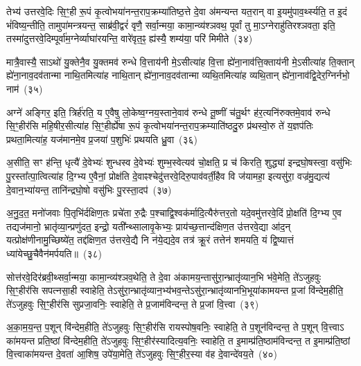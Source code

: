 {\anuvakamend[{यात॒वै ह॑वि॒र्धान॑ञ्च प॒शून्पा॒प्मना॒\-ऽष्टाद॑श च}]}%

तेभ्य॑ उत्तरवे॒दिः सि॒ꣳ॒ही रू॒पं कृ॒त्वोभया॑नन्त॒राप॒क्रम्या॑तिष्ठ॒त्ते दे॒वा अ॑मन्यन्त यत॒रान् वा इ॒यमु॑पाव॒र्थ्स्यति॒ त इ॒दं भं॑विष्य॒न्तीति॒ तामुपा॑मन्त्रयन्त॒ साब्र॑वी॒द्वरं॑ वृणै॒ सर्वा॒न्मया॒ कामा॒न्व्य॑श्ञवथ॒ पूर्वां तु मा॒\-ऽग्नेराहु॑तिरश्ञवता॒ इति॒ तस्मा॑दुत्तरवे॒दिम्पूर्वा॑म॒ग्नेर्व्याघा॑रयन्ति॒ वारे॑वृत॒ꣴ॒ ह्य॑स्यै॒ शम्य॑या॒ परि॑ मिमीते~(३४)

मात्रै॒वास्यै॒ सा\-ऽथो॑ यु॒क्तेनै॒व यु॒क्तमव॑ रुन्धे वि॒त्ताय॑नी मे॒\-ऽसीत्या॑ह वि॒त्ता ह्ये॑ना॒नाव॑त्ति॒क्ताय॑नी मे॒\-ऽसीत्या॑ह ति॒क्तान् ह्ये॑ना॒नाव॒दव॑तान्मा नाथि॒तमित्या॑ह नाथि॒तान् ह्ये॑ना॒नाव॒दव॑तान्मा व्यथि॒तमित्या॑ह व्यथि॒तान् ह्ये॑ना॒नाव॑द्वि॒देर॒ग्निर्नभो॒ नाम॑~(३५)

अग्ने॑ अङ्गिर॒ इति॒ त्रिर्\mbox{}ह॑रति॒ य ए॒वैषु लो॒केष्व॒ग्नय॒स्ताने॒वाव॑ रुन्धे तू॒ष्णीं च॑तु॒र्थꣳ ह॑र॒त्यनि॑रुक्तमे॒वाव॑ रुन्धे सि॒ꣳ॒हीर॑सि महि॒षीर॒सीत्या॑ह सि॒ꣳ॒हीर्\mbox{}ह्ये॑षा रू॒पं कृ॒त्वोभया॑नन्त॒राप॒क्रम्याति॑ष्ठदु॒रु प्र॑थस्वो॒रु ते॑ य॒ज्ञप॑तिः प्रथता॒मित्या॑ह॒ यज॑मानमे॒व प्र॒जया॑ प॒शुभिः॑ प्रथयति ध्रु॒वा~(३६)

अ॒सीति॒ सꣳ ह॑न्ति॒ धृत्यै॑ दे॒वेभ्यः॑ शुन्धस्व दे॒वेभ्यः॑ शुम्भ॒स्वेत्यव॑ चो॒क्षति॒ प्र च॑ किरति॒ शुद्ध्या॑ इन्द्रघो॒षस्त्वा॒ वसु॑भिः पु॒रस्ता᳚त्पा॒त्वित्या॑ह दि॒ग्भ्य ए॒वैनां॒ प्रोक्ष॑ति दे॒वाꣴश्चेदु॑त्तरवे॒दिरु॒पाव॑वर्ती॒हैव वि ज॑यामहा॒ इत्यसु॑रा॒ वज्र॑मु॒द्यत्य॑ दे॒वान॒भ्या॑यन्त॒ तानि॑न्द्रघो॒षो वसु॑भिः पु॒रस्ता॒दप॑~(३७)

अ॒नु॒द॒त॒ मनो॑जवाः पि॒तृभि॑र्दक्षिण॒तः प्रचे॑ता रु॒द्रैः प॒श्चाद्वि॒श्वक॑र्मादि॒त्यैरु॑त्तर॒तो यदे॒वमु॑त्तरवे॒दिं प्रो॒क्षति॑ दि॒ग्भ्य ए॒व तद्यज॑मानो॒ भ्रातृ॑व्या॒न्प्रणु॑दत॒ इन्द्रो॒ यती᳚न्थ्सालावृ॒केभ्यः॒ प्राय॑च्छ॒त्तान्द॑क्षिण॒त उ॑त्तरवे॒द्या आ॑द॒न् यत्प्रोक्ष॑णीनामु॒च्छिष्ये॑त॒ तद्द॑क्षिण॒त उ॑त्तरवे॒द्यै नि न॑ये॒द्यदे॒व तत्र॑ क्रू॒रं तत्तेन॑ शमयति॒ यं द्वि॒ष्यात्तं ध्या॑येच्छु॒चैवैन॑मर्पयति॥~(३८)

{\anuvakamend[{मि॒मी॒ते॒ नाम॑ ध्रु॒वा\-ऽप॑ शु॒चा त्रीणि॑ च}]}%

सोत्त॑रवे॒दिर॑ब्रवी॒थ्सर्वा॒न्मया॒ कामा॒न्व्य॑श्ञव॒थेति॒ ते दे॒वा अ॑कामय॒न्तासु॑रा॒न्भ्रातृ॑व्यान॒भि भ॑वे॒मेति॒ ते॑\-ऽजुहवुः सि॒ꣳ॒हीर॑सि सपत्नसा॒ही स्वाहेति॒ ते\-ऽसु॑रा॒न्भ्रातृ॑व्यान॒भ्य॑भव॒न्ते\-ऽसु॑रा॒न्भ्रातृ॑व्यानभि॒भूया॑कामयन्त प्र॒जां वि॑न्देम॒हीति॒ ते॑\-ऽजुहवुः सि॒ꣳ॒हीर॑सि सुप्रजा॒वनिः॒ स्वाहेति॒ ते प्र॒जाम॑विन्दन्त॒ ते प्र॒जां वि॒त्त्वा~(३९)

अ॒का॒म॒य॒न्त॒ प॒शून् वि॑न्देम॒हीति॒ ते॑\-ऽजुहवुः सि॒ꣳ॒हीर॑सि रायस्पोष॒वनिः॒ स्वाहेति॒ ते प॒शून॑विन्दन्त॒ ते प॒शून् वि॒त्त्वा\-ऽ का॑मयन्त प्रति॒ष्ठां वि॑न्देम॒हीति॒ ते॑\-ऽजुहवुः सि॒ꣳ॒हीर॑स्यादित्य॒वनिः॒ स्वाहेति॒ त इ॒माम्प्र॑ति॒ष्ठाम॑विन्दन्त॒ त इ॒माम्प्र॑ति॒ष्ठां वि॒त्त्वाका॑मयन्त दे॒वता॑ आ॒शिष॒ उपे॑या॒मेति॒ ते॑\-ऽजुहवुः सि॒ꣳ॒हीर॒स्या व॑ह दे॒वान्दे॑वय॒ते~(४०)

